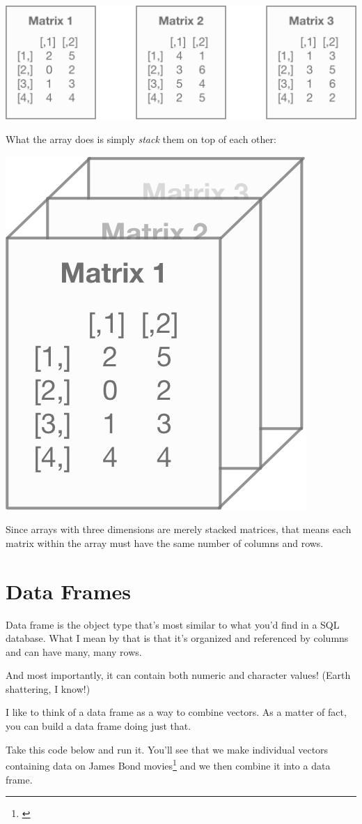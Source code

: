\documentclass[
]{book}
\begin{document}
\begin{center}\includegraphics[width=0.5\linewidth]{1.29_Arrays_Flat} \end{center}

What the array does is simply \emph{stack} them on top of each other:

\begin{center}\includegraphics[width=0.15\linewidth]{1.30_Arrays_Stacked} \end{center}

Since arrays with three dimensions are merely stacked matrices, that means each matrix within the array must have the same number of columns and rows.

\hypertarget{data-frames}{%
\section{Data Frames}\label{data-frames}}

Data frame is the object type that's most similar to what you'd find in a SQL database. What I mean by that is that it's organized and referenced by columns and can have many, many rows.

And most importantly, it can contain both numeric and character values! (Earth shattering, I know!)

I like to think of a data frame as a way to combine vectors. As a matter of fact, you can build a data frame doing just that.

Take this code below and run it. You'll see that we make individual vectors containing data on James Bond movies\footnote{\citet{noauthor_james_nodate}} and we then combine it into a data frame.
\end{document}
